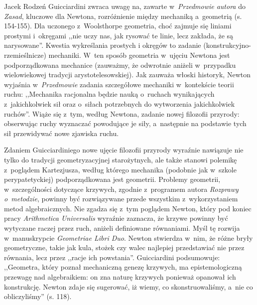 \begin{recplenv}{Jacek Rodzeń}
Guicciardini zwraca uwagę na, zawarte w~\textit{Przedmowie autora} do \textit{Zasad}, kluczowe dla Newtona,
rozróżnienie między mechaniką a~geometrią (s. 154-155). Dla uczonego z~Woolsthorpe geometria, choć zajmuje się liniami
prostymi i~okręgami ,,nie uczy nas, jak rysować te linie, lecz zakłada, że są narysowane''. Kwestia wykreślania prostych
i okręgów to zadanie (konstrukcyjno-rzemieślnicze) mechaniki. W~ten sposób geometria w~ujęciu Newtona jest
podporządkowana mechanice (zauważmy, że odwrotnie aniżeli w~przypadku wielowiekowej tradycji arystotelesowskiej). Jak
zauważa włoski historyk, Newton wyjaśnia w~\textit{Przedmowie} zadania szczegółowe mechaniki w~kontekście teorii ruchu:
,,Mechanika racjonalna będzie nauką o~ruchach wynikających z~jakichkolwiek sił oraz o~siłach potrzebnych do wytworzenia
jakichkolwiek ruchów''. Wiąże się z~tym, według Newtona, zadanie nowej filozofii przyrody: obserwując ruchy wyznaczać
powodujące je siły, a~następnie na podstawie tych sił przewidywać nowe zjawiska ruchu. 

Zdaniem Guicciardiniego nowe ujęcie filozofii przyrody wyraźnie nawiązuje nie tylko do tradycji geometryzacyjnej
starożytnych, ale także stanowi polemikę z~poglądem Kartezjusza, według którego mechanika (podobnie jak w~szkole
perypatetyckiej) podporządkowana jest geometrii. Problemy geometrii, w~szczególności dotyczące krzywych,
zgodnie z~programem autora \textit{Rozprawy o~metodzie}, powinny być rozwiązywane przede wszystkim z~wykorzystaniem metod
algebraicznych. Nie zgadza się z~tym poglądem Newton, który pod koniec pracy \textit{Arithmetica Universalis} wyraźnie
zaznacza, że krzywe powinny być wytyczane raczej przez ruch, aniżeli definiowane równaniami. Myśl tę
rozwija w~manuskrypcie \textit{Geometriae Libri Duo}. Newton stwierdza w~nim, że różne bryły geometryczne,
takie jak kula, stożek
czy walec najlepiej przedstawiać nie przez równania, lecz przez ,,racje ich powstania''. Guicciardini podsumowuje:
,,Geometra, który poznał mechaniczną genezę krzywych, ma epistemologiczną przewagę nad algebraikiem: on zna naturę
krzywych ponieważ opanował ich konstrukcję. Newton zdaje się sugerować, iż wiemy, co skonstruowaliśmy, a~nie co
obliczyliśmy'' (s. 118).


\end{recplenv}
